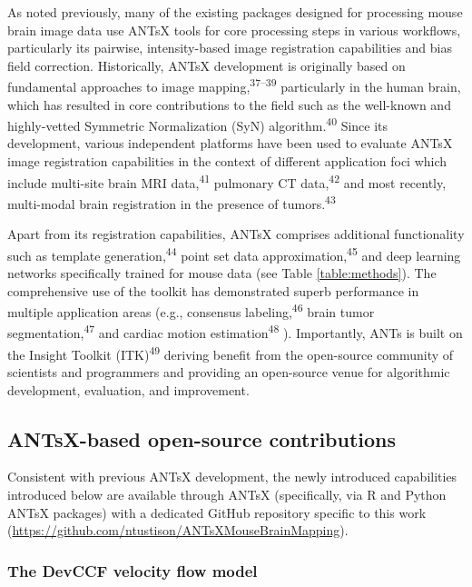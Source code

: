 \documentclass[
  12pt,
]{article}
\begin{document}
As noted previously, many of the existing packages designed for
processing mouse brain image data use ANTsX tools for core processing
steps in various workflows, particularly its pairwise, intensity-based
image registration capabilities and bias field correction. Historically,
ANTsX development is originally based on fundamental approaches to image
mapping,\textsuperscript{37--39} particularly in the human brain, which
has resulted in core contributions to the field such as the well-known
and highly-vetted Symmetric Normalization (SyN)
algorithm.\textsuperscript{40} Since its development, various
independent platforms have been used to evaluate ANTsX image
registration capabilities in the context of different application foci
which include multi-site brain MRI data,\textsuperscript{41} pulmonary
CT data,\textsuperscript{42} and most recently, multi-modal brain
registration in the presence of tumors.\textsuperscript{43}



Apart from its registration capabilities, ANTsX comprises additional
functionality such as template generation,\textsuperscript{44} point set
data approximation,\textsuperscript{45} and deep learning networks
specifically trained for mouse data (see Table \ref{table:methods}). The
comprehensive use of the toolkit has demonstrated superb performance in
multiple application areas (e.g., consensus
labeling,\textsuperscript{46} brain tumor
segmentation,\textsuperscript{47} and cardiac motion
estimation\textsuperscript{48} ). Importantly, ANTs is built on the
Insight Toolkit (ITK)\textsuperscript{49} deriving benefit from the
open-source community of scientists and programmers and providing an
open-source venue for algorithmic development, evaluation, and
improvement.

\hypertarget{antsx-based-open-source-contributions}{%
\subsection{ANTsX-based open-source
contributions}\label{antsx-based-open-source-contributions}}

Consistent with previous ANTsX development, the newly introduced
capabilities introduced below are available through ANTsX (specifically,
via R and Python ANTsX packages) with a dedicated GitHub repository
specific to this work
(\url{https://github.com/ntustison/ANTsXMouseBrainMapping}).

\hypertarget{the-devccf-velocity-flow-model}{%
\subsubsection{The DevCCF velocity flow
model}\label{the-devccf-velocity-flow-model}}
\end{document}
